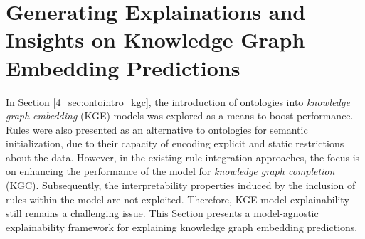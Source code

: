 \section{Generating Explainations and Insights on Knowledge Graph Embedding Predictions}\label{6_sec:geni_main}
In Section \ref{4_sec:ontointro_kgc}, the introduction of ontologies into \textit{knowledge graph embedding} (KGE) models was explored as a means to boost performance. Rules were also presented as an alternative to ontologies for semantic initialization, due to their capacity of encoding explicit and static restrictions about the data. However, in the existing rule integration approaches, the focus is on enhancing the performance of the model for \textit{knowledge graph completion} (KGC). Subsequently, the interpretability properties induced by the inclusion of rules within the model are not exploited. Therefore, KGE model explainability still remains a challenging issue. This Section presents a model-agnostic explainability framework for explaining knowledge graph embedding predictions.

\color{purple}

